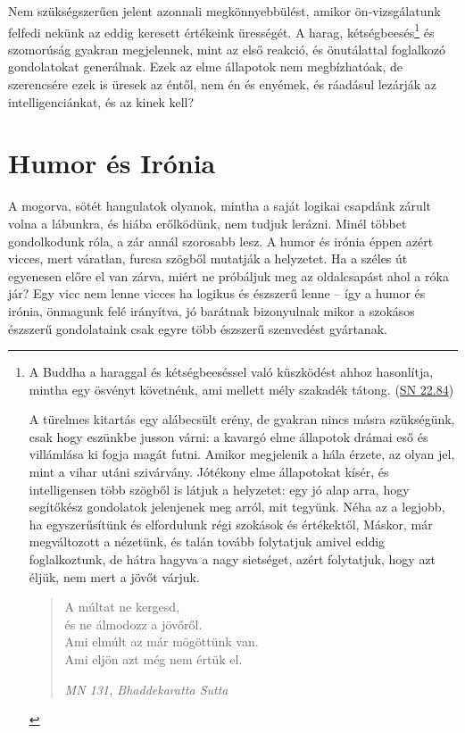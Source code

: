 Nem szükségszerűen jelent azonnali megkönnyebbülést, amikor
ön-vizsgálatunk felfedi nekünk az eddig keresett értékeink ürességét. A
harag, kétségbeesés\footnote{A Buddha a haraggal és kétségbeeséssel való
  küszködést ahhoz hasonlítja, mintha egy ösvényt követnénk, ami mellett
  mély szakadék tátong.
  (\href{https://www.accesstoinsight.org/tipitaka/sn/sn22/sn22.084.than.html}{SN
  22.84})

  A türelmes kitartás egy alábecsült erény, de gyakran nincs másra
  szükségünk, csak hogy eszünkbe jusson várni: a kavargó elme állapotok
  drámai eső és villámlása ki fogja magát futni. Amikor megjelenik a
  hála érzete, az olyan jel, mint a vihar utáni szivárvány. Jótékony
  elme állapotokat kísér, és intelligensen több szögből is látjuk a
  helyzetet: egy jó alap arra, hogy segítőkész gondolatok jelenjenek meg
  arról, mit tegyünk. Néha az a legjobb, ha egyszerűsítünk és
  elfordulunk régi szokások és értékektől, Máskor, már megváltozott a
  nézetünk, és talán tovább folytatjuk amivel eddig foglalkoztunk, de
  hátra hagyva a nagy sietséget, azért folytatjuk, hogy azt éljük, nem
  mert a jövőt várjuk.

  \begin{quote}
  A múltat ne kergesd,\\
  és ne álmodozz a jövőről.\\
  Ami elmúlt az már mögöttünk van.\\
  Ami eljön azt még nem értük el.

  \emph{MN 131, Bhaddekaratta Sutta}
  \end{quote}} és szomorúság gyakran megjelennek, mint az első reakció,
és önutálattal foglalkozó gondolatokat generálnak. Ezek az elme
állapotok nem megbízhatóak, de szerencsére ezek is üresek az éntől, nem
én és enyémek, és ráadásul lezárják az intelligenciánkat, és az kinek
kell?

\section{Humor és Irónia}

A mogorva, sötét hangulatok olyanok, mintha a saját logikai csapdánk
zárult volna a lábunkra, és hiába erőlködünk, nem tudjuk lerázni. Minél
többet gondolkodunk róla, a zár annál szorosabb lesz. A humor és irónia
éppen azért vicces, mert váratlan, furcsa szögből mutatják a helyzetet.
Ha a széles út egyenesen előre el van zárva, miért ne próbáljuk meg az
oldalcsapást ahol a róka jár? Egy vicc nem lenne vicces ha logikus és
észszerű lenne -- így a humor és irónia, önmagunk felé irányítva, jó
barátnak bizonyulnak mikor a szokásos észszerű gondolataink csak egyre
több észszerű szenvedést gyártanak.

